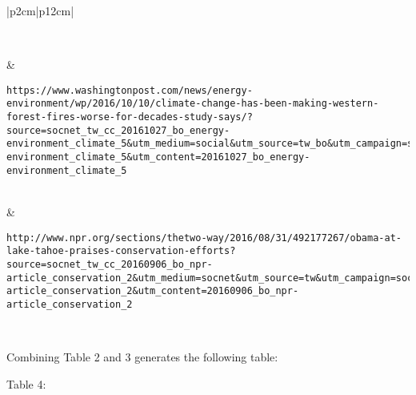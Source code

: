 \documentclass[a4paper, 11pt]{article}
\begin{document}
\begin{longtable}{ |p{2cm}|p{12cm}| }
\begin{lstlisting}[breakatwhitespace=〈false)]
  \end{lstlisting}
 \\ 
   &
\begin{lstlisting}[breakatwhitespace=〈false)] 
https://www.washingtonpost.com/news/energy-environment/wp/2016/10/10/climate-change-has-been-making-western-forest-fires-worse-for-decades-study-says/?source=socnet_tw_cc_20161027_bo_energy-environment_climate_5&utm_medium=social&utm_source=tw_bo&utm_campaign=socnet_tw_cc_20161027_bo_energy-environment_climate_5&utm_content=20161027_bo_energy-environment_climate_5 
\end{lstlisting}
\\
  &
\begin{lstlisting}[breakatwhitespace=〈false)] 
http://www.npr.org/sections/thetwo-way/2016/08/31/492177267/obama-at-lake-tahoe-praises-conservation-efforts?source=socnet_tw_cc_20160906_bo_npr-article_conservation_2&utm_medium=socnet&utm_source=tw&utm_campaign=socnet_tw_cc_20160906_bo_npr-article_conservation_2&utm_content=20160906_bo_npr-article_conservation_2 
\end{lstlisting}
\\
 \hline
\end{longtable}

Combining Table 2 and 3 generates the following table:

Table 4:
\end{document}
